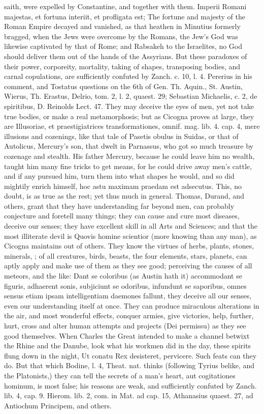 {saith, were expelled by Constantine, and together with them. Imperii
Romani majestas, et fortuna interiit, et profligata est; The fortune
and majesty of the Roman Empire decayed and vanished, as that heathen
in Minutius formerly bragged, when the Jews were overcome by the
Romans, the Jew's God was likewise captivated by that of Rome; and
Rabsakeh to the Israelites, no God should deliver them out of the hands
of the Assyrians. But these paradoxes of their power, corporeity,
mortality, taking of shapes, transposing bodies, and carnal
copulations, are sufficiently confuted by Zanch. c. 10, l. 4. Pererius
in his comment, and Tostatus questions on the 6th of Gen. Th. Aquin.,
St. Austin, Wierus, Th. Erastus, Delrio, tom. 2, l. 2, quaest. 29;
Sebastian Michaelis, c. 2, de spiritibus, D. Reinolds Lect. 47. They
may deceive the eyes of men, yet not take true bodies, or make a real
metamorphosis; but as Cicogna proves at large, they are
Illusoriae, et praestigiatrices transformationes, omnif. mag.
lib. 4. cap. 4, mere illusions and cozenings, like that tale of Pasetis
obulus in Suidas, or that of Autolicus, Mercury's son, that dwelt in
Parnassus, who got so much treasure by cozenage and stealth. His father
Mercury, because he could leave him no wealth, taught him many fine
tricks to get means, for he could drive away men's cattle, and if
any pursued him, turn them into what shapes he would, and so did
mightily enrich himself, hoc astu maximam praedam est adsecutus. This,
no doubt, is as true as the rest; yet thus much in general. Thomas,
Durand, and others, grant that they have understanding far beyond men,
can probably conjecture and foretell many things; they can cause
and cure most diseases, deceive our senses; they have excellent skill
in all Arts and Sciences; and that the most illiterate devil is Quovis
homine scientior (more knowing than any man), as Cicogna
maintains out of others. They know the virtues of herbs, plants,
stones, minerals, \etc{}; of all creatures, birds, beasts, the four
elements, stars, planets, can aptly apply and make use of them as they
see good; perceiving the causes of all meteors, and the like: Dant se
coloribus (as  Austin hath it) accommodant se figuris, adhaerent
sonis, subjiciunt se odoribus, infundunt se saporibus, omnes sensus
etiam ipsam intelligentiam daemones fallunt, they deceive all our
senses, even our understanding itself at once. They can produce
miraculous alterations in the air, and most wonderful effects, conquer
armies, give victories, help, further, hurt, cross and alter human
attempts and projects (Dei permissu) as they see good themselves.
When Charles the Great intended to make a channel betwixt the
Rhine and the Danube, look what his workmen did in the day, these
spirits flung down in the night, Ut conatu Rex desisteret, pervicere.
Such feats can they do. But that which Bodine, l. 4, Theat. nat. thinks
(following Tyrius belike, and the Platonists,) they can tell the
secrets of a man's heart, aut cogitationes hominum, is most false; his
reasons are weak, and sufficiently confuted by Zanch. lib. 4, cap. 9.
Hierom. lib. 2, com. in Mat. ad cap. 15, Athanasius quaest. 27, ad
Antiochum Principem, and others.
}

